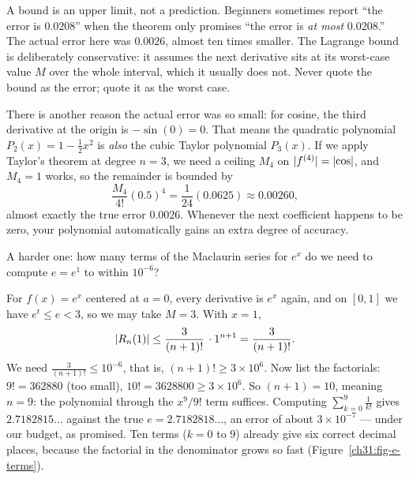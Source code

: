 \begin{trapbox}
A bound is an upper limit, not a prediction. Beginners sometimes report ``the error
is $0.0208$'' when the theorem only promises ``the error is \emph{at most}
$0.0208$.'' The actual error here was $0.0026$, almost ten times smaller. The
Lagrange bound is deliberately conservative: it assumes the next derivative sits at
its worst-case value $M$ over the whole interval, which it usually does not. Never
quote the bound as the error; quote it as the worst case.

There is another reason the actual error was so small: for cosine, the third
derivative at the origin is $-\sin(0) = 0$. That means the quadratic polynomial
$P_2(x) = 1 - \tfrac12 x^2$ is \emph{also} the cubic Taylor polynomial $P_3(x)$.
If we apply Taylor's theorem at degree $n=3$, we need a ceiling $M_4$ on
$\lvert f^{(4)}\rvert = \lvert\cos\rvert$, and $M_4 = 1$ works, so the remainder is bounded by
\[
  \frac{M_4}{4!}(0.5)^4 = \frac{1}{24}(0.0625) \approx 0.00260,
\]
almost exactly the true error $0.0026$. Whenever the next coefficient happens to be
zero, your polynomial automatically gains an extra degree of accuracy.
\end{trapbox}

\begin{labbox}
A harder one: how many terms of the Maclaurin series for $e^x$ do
we need to compute $e = e^1$ to within $10^{-6}$?

For $f(x) = e^x$ centered at $a=0$, every derivative is $e^x$ again, and on
$[0,1]$ we have $e^t \le e < 3$, so we may take $M = 3$. With $x=1$,
\[
  \lvert R_n(1)\rvert \le \frac{3}{(n+1)!}\,\cdot 1^{n+1} = \frac{3}{(n+1)!}.
\]
We need $\frac{3}{(n+1)!} \le 10^{-6}$, that is, $(n+1)! \ge 3\times 10^{6}$. Now list the
factorials: $9! = 362880$ (too small), $10! = 3628800 \ge 3\times10^6$.
So $(n+1) = 10$, meaning $n = 9$: the polynomial through the $x^9/9!$ term suffices.
Computing $\sum_{k=0}^{9} \frac{1}{k!}$ gives $2.7182815\ldots$ against the true
$e = 2.7182818\ldots$, an error of about $3\times 10^{-7}$ --- under our budget, as
promised. Ten terms ($k = 0$ to $9$) already give six correct decimal places,
because the factorial in the denominator grows so fast
(Figure~\ref{ch31:fig-e-terms}).
\end{labbox}

